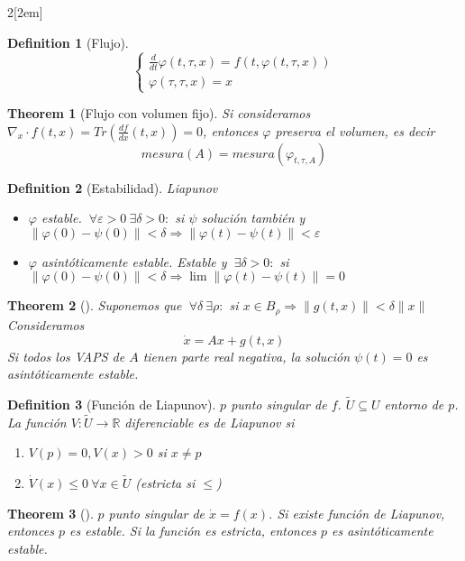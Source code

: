 \documentclass[leqno]{article}
\newtheorem*{definition}{Definition}
\newtheorem*{theorem}{Theorem}
\begin{document}
\begin{multicols}{2}[\columnsep2em]
\begin{definition}[Flujo]
\[
\begin{cases}
  \frac{d }{d t} \varphi (t, \tau , x) = f(t, \varphi (t, \tau , x))\\
  \varphi (\tau, \tau , x) = x
\end{cases}
\] 
\end{definition}

\begin{theorem}[Flujo con volumen fijo] Si consideramos $\nabla_{x}\cdot f(t, x) = Tr(\frac{d f}{d x} (t, x)) = 0$, entonces $\varphi $ preserva el volumen, es decir
  \[
  mesura(A) = mesura(\varphi_{t, \tau , A})
  \] 
\end{theorem}

\begin{definition}[Estabilidad] Liapunov
  \begin{itemize}[topsep=-6pt, itemsep=0pt]
    \item $\varphi $ estable. $\ \forall \varepsilon >0 \ \exists \delta>0: $ si $\psi $ solución también y  $\|\varphi (0)-\psi (0)\|<\delta \Rightarrow \|\varphi (t)-\psi (t)\|<\varepsilon $ 
	\item $\varphi $ asintóticamente estable. Estable y $\ \exists \delta>0: $ si $\|\varphi (0)-\psi (0)\|<\delta \Rightarrow \lim \|\varphi (t)-\psi (t)\| = 0$
  \end{itemize}
\end{definition}

\begin{theorem}[] Suponemos que $\ \forall \delta \ \exists \rho : $ si $ x\in B_{\rho } \Rightarrow \|g(t, x)\|<\delta\|x\| $ Consideramos
  \[
  \dot{x} = Ax + g(t, x)
  \] 
  Si todos los VAPS de $A$ tienen parte real negativa, la solución $\psi (t) = 0$ es asintóticamente estable.
\end{theorem}

\begin{definition}[Función de Liapunov] $p$ punto singular de $f$. $\tilde{U}\subseteq U$ entorno de $p$. La función $V: \tilde{U}\to \mathbb{R}$ diferenciable es de Liapunov si
  \begin{enumerate}[topsep=-6pt, itemsep=0pt]
    \item $V(p)=0, V(x)>0$ si $x\neq p$
	\item $\dot{V}(x)\le 0 \ \forall x\in \tilde{U}$ (estricta si $\le $)
  \end{enumerate}
\end{definition}

\begin{theorem}[] $p$ punto singular de  $\dot{x}=f(x)$. Si existe función de Liapunov, entonces $p$ es estable. Si la función es estricta, entonces  $p$ es asintóticamente estable.
\end{theorem}


\end{multicols}
\end{document}
